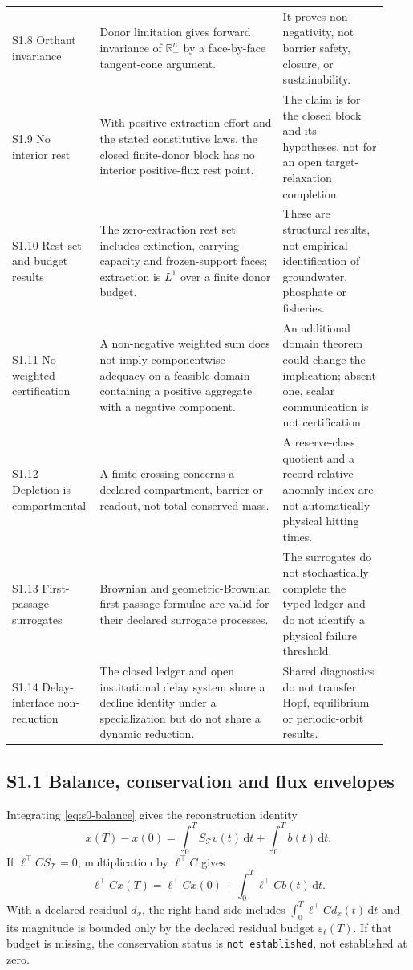 \documentclass[11pt]{article}
\newcommand{\nesta}{\texttt{not established}}
\newcommand{\Rpos}{\mathbb{R}_{+}}
\newcommand{\dd}{\,\mathrm{d}}
\begin{document}
\begin{longtable}{@{}P{0.19\linewidth}P{0.47\linewidth}P{0.27\linewidth}@{}}
S1.8 Orthant invariance & Donor limitation gives forward invariance of $\Rpos^n$ by a face-by-face tangent-cone argument. & It proves non-negativity, not barrier safety, closure, or sustainability. \\
S1.9 No interior rest & With positive extraction effort and the stated constitutive laws, the closed finite-donor block has no interior positive-flux rest point. & The claim is for the closed block and its hypotheses, not for an open target-relaxation completion. \\
S1.10 Rest-set and budget results & The zero-extraction rest set includes extinction, carrying-capacity and frozen-support faces; extraction is $L^1$ over a finite donor budget. & These are structural results, not empirical identification of groundwater, phosphate or fisheries. \\
S1.11 No weighted certification & A non-negative weighted sum does not imply componentwise adequacy on a feasible domain containing a positive aggregate with a negative component. & An additional domain theorem could change the implication; absent one, scalar communication is not certification. \\
S1.12 Depletion is compartmental & A finite crossing concerns a declared compartment, barrier or readout, not total conserved mass. & A reserve-class quotient and a record-relative anomaly index are not automatically physical hitting times. \\
S1.13 First-passage surrogates & Brownian and geometric-Brownian first-passage formulae are valid for their declared surrogate processes. & The surrogates do not stochastically complete the typed ledger and do not identify a physical failure threshold. \\
S1.14 Delay-interface non-reduction & The closed ledger and open institutional delay system share a decline identity under a specialization but do not share a dynamic reduction. & Shared diagnostics do not transfer Hopf, equilibrium or periodic-orbit results. \\
\end{longtable}

\subsection*{S1.1 Balance, conservation and flux envelopes}

Integrating \eqref{eq:s0-balance} gives the reconstruction identity
\begin{equation}
x(T)-x(0)=\int_0^T S_{\mathcal T}v(t)\dd t+\int_0^T b(t)\dd t.\label{eq:reconstruction}
\end{equation}
If $\ell^{\top}CS_{\mathcal T}=0$, multiplication by $\ell^{\top}C$ gives
\begin{equation}
\ell^{\top}Cx(T)=\ell^{\top}Cx(0)+\int_0^T\ell^{\top}Cb(t)\dd t.\label{eq:conservation}
\end{equation}
With a declared residual $d_x$, the right-hand side includes $\int_0^T\ell^{\top}Cd_x(t)\dd t$ and its magnitude is bounded only by the declared residual budget $\varepsilon_\ell(T)$. If that budget is missing, the conservation status is \nesta{}, not established at zero.
\end{document}
